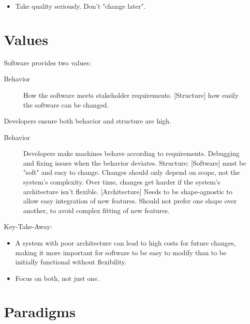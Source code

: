 \documentclass[../Main.tex]{subfiles}
\begin{document}
\begin{itemize}
    \item Take quality seriously. Don't "change later".
\end{itemize}

\section{Values}
Software provides two values:
\begin{description}
    \item[Behavior] How the software meets stakeholder requirements.
    [Structure] how easily the software can be changed.
\end{description}

Developers ensure both behavior and structure are high.

\begin{description}
    \item[Behavior]
    Developers make machines behave according to requirements.
    Debugging and fixing issues when the behavior deviates.
    Structure:
    [Software] must be "soft" and easy to change.
    Changes should only depend on scope, not the system's complexity.
    Over time, changes get harder if the system's architecture isn't flexible.
    [Architecture]
    Needs to be shape-agnostic to allow easy integration of new features.
    Should not prefer one shape over another, to avoid complex fitting of new features.
\end{description}

Key-Take-Away:
\begin{itemize}
    \item A system with poor architecture can lead to high costs for future changes,
    making it more important for software to be easy to modify than to be initially functional without flexibility.
    \item Focus on both, not just one.
\end{itemize}

\section{Paradigms}
\end{document}
